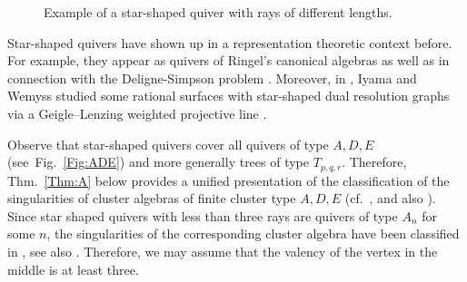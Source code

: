 \documentclass[letter,11pt]{amsart}
\theoremstyle{theorem}
\theoremstyle{definition}
\numberwithin{equation}{section}
\begin{document}
\begin{figure}[h!]
{
}
	\caption{Example of a star-shaped quiver with rays of different lengths.}
	\label{Fig:Ex_star_quiver}
\end{figure}


Star-shaped quivers have shown up in a representation theoretic context before.
For example, they appear as quivers of Ringel's canonical algebras \cite{Ringel84}
as well as in connection with the Deligne-Simpson problem \cite{C-B_S_2006, C-B_H_2025}.
Moreover, in \cite{IW_weighted}, Iyama and Wemyss studied some rational surfaces with star-shaped dual resolution graphs via a Geigle--Lenzing weighted projective line \cite{GeigleLenzing87}.



Observe that star-shaped quivers cover all quivers of type $ A, D, E $ (see~Fig.~\ref{Fig:ADE})
and more generally trees of type $ T_{p,q,r} $.
Therefore, Thm.~\ref{Thm:A} below provides a unified presentation of the classification of the singularities of cluster algebras of finite cluster type $ A, D, E $ 
(cf.~\cite[Thm.~A,~D,~E]{BFMS25}, and also \cite[Thm.~A]{BFMS23}).
\\
Since star shaped quivers with less than three rays are quivers of type $ A_n $ for some $ n $,
the singularities of the corresponding cluster algebra %
have been classified in \cite[Thm.~A]{BFMS25}, see also \cite[Thm.~A]{BFMS23}.
Therefore, we may assume that the valency of the vertex in the middle is at least three.
\end{document}
